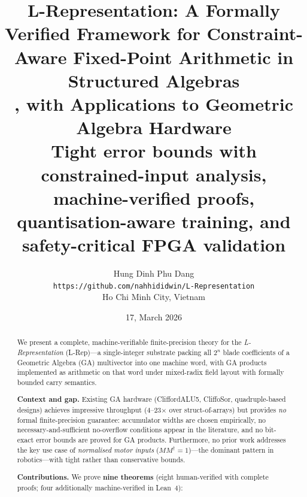 \documentclass[11pt,a4paper]{article}
\title{\textbf{L-Representation: A Formally Verified Framework for Constraint-Aware Fixed-Point Arithmetic in Structured Algebras\\, with Applications to Geometric Algebra Hardware}\\[6pt]
\large Tight error bounds with constrained-input analysis,
machine-verified proofs,\\
quantisation-aware training, and safety-critical FPGA validation}
\author{Hung Dinh Phu Dang\\
\small \texttt{https://github.com/nahhididwin/L-Representation}\\
\small Ho Chi Minh City, Vietnam}
\date{17, March 2026}
\theoremstyle{definition}
\theoremstyle{plain}
\theoremstyle{remark}
\begin{document}
\maketitle

\begin{abstract}
We present a complete, machine-verifiable finite-precision theory for the
\emph{L-Representation} (L-Rep)---a single-integer substrate packing all
$2^n$ blade coefficients of a Geometric Algebra (GA) multivector into one
machine word, with GA products implemented as arithmetic on that word under
mixed-radix field layout with formally bounded carry semantics.

\textbf{Context and gap.}
Existing GA hardware (CliffordALU5, CliffoSor, quadruple-based designs)
achieves impressive throughput (4--23$\times$ over struct-of-arrays) but
provides \emph{no} formal finite-precision guarantee: accumulator widths are
chosen empirically, no necessary-and-sufficient no-overflow conditions appear
in the literature, and no bit-exact error bounds are proved for GA products.
Furthermore, no prior work addresses the key use case of
\emph{normalised motor inputs} ($MM^\dagger=1$)---the dominant pattern in
robotics---with tight rather than conservative bounds.

\textbf{Contributions.}
We prove \textbf{nine theorems} (eight human-verified with complete proofs;
four additionally machine-verified in Lean~4):


\end{abstract}
\end{document}
